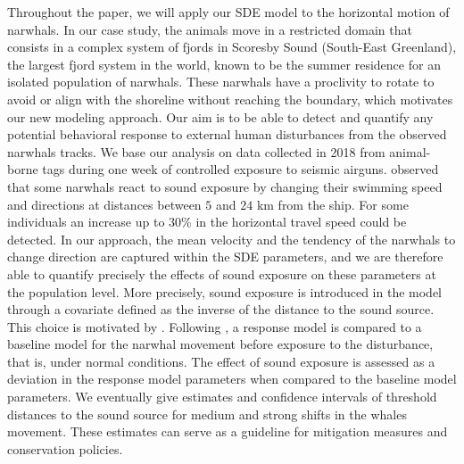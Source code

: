 \documentclass[aoas]{imsart}
\theoremstyle{definition}
\theoremstyle{remark}
\theoremstyle{remark}
\newcommand {\1}{\mathbb{1}}
\begin{document}
Throughout the paper, we will apply our SDE model to the horizontal motion of narwhals.
In our case study, the animals move in a restricted domain that consists in a complex system of fjords in Scoresby Sound (South-East Greenland), the largest fjord system in the world, known to be the summer residence for an isolated population of narwhals. These narwhals have a proclivity to rotate to avoid or align with the shoreline without reaching the boundary, which motivates our new modeling approach. Our aim is to be able to detect and quantify any potential behavioral response to external human disturbances from the observed narwhals tracks. We base our analysis on data collected in 2018 \citep{heide-jorgensen_behavioral_2021} from animal-borne tags during one week of controlled exposure to seismic airguns. 
\cite{heide-jorgensen_behavioral_2021} observed that some narwhals react to sound exposure by changing their swimming speed and directions at distances between $5$ and $24$ km from the ship. For some individuals an increase up to  $30\%$ in the horizontal travel speed could be detected. In our approach, the mean velocity and the tendency of the narwhals to change direction are captured within the SDE parameters, and we are therefore able to quantify precisely the effects of sound exposure on these parameters at the population level. More precisely, sound exposure is introduced in the model through a covariate defined as the inverse of the distance to the sound source. This choice is motivated by \citep{heide-jorgensen_behavioral_2021, tervo_narwhals_2021,tervo_stuck_2023}. Following \cite{michelot_continuous-time_2022}, a response model is compared to a baseline model for the narwhal movement before exposure to the disturbance, that is, under normal conditions. The effect of sound exposure is assessed as a deviation in the response model parameters when compared to the baseline model parameters. We eventually give estimates and confidence intervals of threshold distances to the sound source for medium and strong shifts in the whales movement. These estimates can serve as a guideline for mitigation measures and conservation policies.  \\
\end{document}
